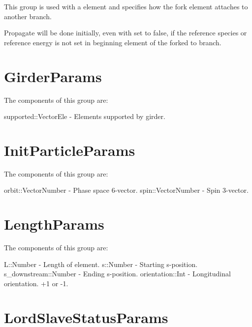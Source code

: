 This group is used with a  element and specifies how the fork element attaches to
another branch. 

Propagate will be done initially, even with  set to false, if the
reference species or reference energy is not set in beginning element of the forked to branch.

\section{GirderParams}
\label{s:girder.g}

The components of this group are:
\begin{example}
  supported::Vector{Ele}    - Elements supported by girder. 
\end{example}


\section{InitParticleParams}
\label{s:init.particle.g}

The components of this group are:
\begin{example}
  orbit::Vector{Number}     - Phase space 6-vector. 
  spin::Vector{Number}      - Spin 3-vector. \end{example}

\section{LengthParams}
\label{s:length.g}

The components of this group are:
\begin{example}
  L::Number               - Length of element. 
  s::Number               - Starting s-position. 
  s_downstream::Number    - Ending s-position. 
  orientation::Int        - Longitudinal orientation. +1 or -1. 
\end{example}

\section{LordSlaveStatusParams}
\label{s:lord.slave.g}
\label{s:lord.enum}
\label{s:slave.enum}


